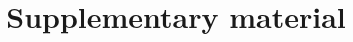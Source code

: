 \documentclass[12pt,a4paper]{article}
\title{Supplementary material\\[8pt]\large\ManuscriptTitle}
\author{\AuthorNames\\[10pt]\parbox{0.96\textwidth}{\centering\small\AuthorDetails}}
\date{}
\begin{document}
\begin{singlespace}
\maketitle
\end{singlespace}
\thispagestyle{plain}
\clearpage
\renewcommand{\thepage}{S\arabic{page}}
\setcounter{page}{1}
\linenumbers

\clearpage
\end{document}
